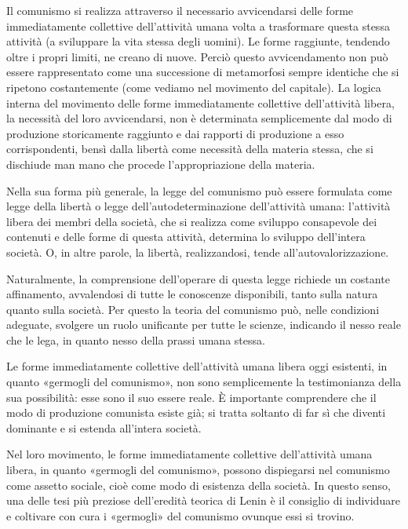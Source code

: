 \documentclass[../main]{subfiles}
\begin{document}
Il comunismo si realizza attraverso il necessario avvicendarsi delle forme immediatamente collettive dell'attività umana volta a trasformare questa stessa attività (a sviluppare la vita stessa degli uomini). Le forme raggiunte, tendendo oltre i propri limiti, ne creano di nuove. Perciò questo avvicendamento non può essere rappresentato come una successione di metamorfosi sempre identiche che si ripetono costantemente (come vediamo nel movimento del capitale). La logica interna del movimento delle forme immediatamente collettive dell'attività libera, la necessità del loro avvicendarsi, non è determinata semplicemente dal modo di produzione storicamente raggiunto e dai rapporti di produzione a esso corrispondenti, bensì dalla libertà come necessità della materia stessa, che si dischiude man mano che procede l'appropriazione della materia.

Nella sua forma più generale, la legge del comunismo può essere formulata come legge della libertà o legge dell'autodeterminazione dell'attività umana: l'attività libera dei membri della società, che si realizza come sviluppo consapevole dei contenuti e delle forme di questa attività, determina lo sviluppo dell'intera società. O, in altre parole, la libertà, realizzandosi, tende all'autovalorizzazione.

Naturalmente, la comprensione dell'operare di questa legge richiede un costante affinamento, avvalendosi di tutte le conoscenze disponibili, tanto sulla natura quanto sulla società. Per questo la teoria del comunismo può, nelle condizioni adeguate, svolgere un ruolo unificante per tutte le scienze, indicando il nesso reale che le lega, in quanto nesso della prassi umana stessa.

Le forme immediatamente collettive dell'attività umana libera oggi esistenti, in quanto «germogli del comunismo», non sono semplicemente la testimonianza della sua possibilità: esse sono il suo essere reale. È importante comprendere che il modo di produzione comunista esiste già; si tratta soltanto di far sì che diventi dominante e si estenda all'intera società.

Nel loro movimento, le forme immediatamente collettive dell'attività umana libera, in quanto «germogli del comunismo», possono dispiegarsi nel comunismo come assetto sociale, cioè come modo di esistenza della società. In questo senso, una delle tesi più preziose dell'eredità teorica di Lenin è il consiglio di individuare e coltivare con cura i «germogli» del comunismo ovunque essi si trovino.
\end{document}
